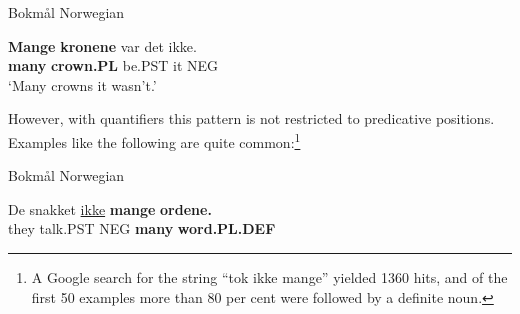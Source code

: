 
\item 

Bokmål Norwegian 



 \ea\label{}
\gll \textbf{Mange}\textbf{  kronene} var  det  ikke.\\


\textbf{many} \textbf{crown.PL} be.PST  it  NEG\\

\glt ‘Many crowns it wasn’t.’

\z

However, with quantifiers this pattern is not restricted to predicative positions. Examples like the following are quite common:\footnote{ A Google search for the string “tok ikke mange” yielded 1360 hits, and of the first 50 examples more than 80 per cent were followed by a definite noun.}


\item 

Bokmål Norwegian 



\item 


 \ea\label{}
\gll De  snakket  \href{http://kh.hd.uib.no/cgi-dos/roman-bm.bat?P55377C00#here}{ikke}  \textbf{mange}\textbf{  ordene.}\\


they  talk.PST  NEG  \textbf{many} \textbf{word.PL.DEF}\\

